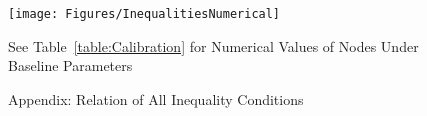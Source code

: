 \begin{figure}[ht]
  \centerline{
    \texttt{[image: Figures/InequalitiesNumerical]}
  }
  \caption{Appendix: Relation of All Inequality Conditions} \label{fig:InequalitiesNumerical}
\centerline{See Table~\ref{table:Calibration} for Numerical Values of Nodes Under Baseline Parameters}
\end{figure}
